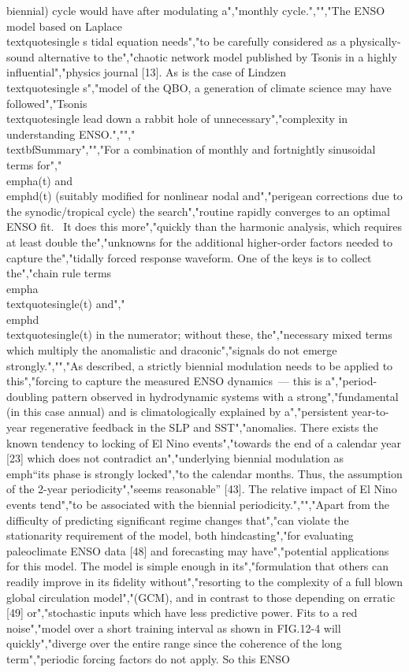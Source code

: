 {{{{{{{{{{biennial) cycle would have after modulating a","monthly cycle.","","The ENSO model based on Laplace\\textquotesingle s tidal equation needs","to be carefully considered as a physically-sound alternative to the","chaotic network model published by Tsonis in a highly influential","physics journal {[}13{]}. As is the case of Lindzen\\textquotesingle s","model of the QBO, a generation of climate science may have followed","Tsonis\\textquotesingle{} lead down a rabbit hole of unnecessary","complexity in understanding ENSO.","","\\textbf{Summary}","","For a combination of monthly and fortnightly sinusoidal terms for","\\emph{a(t)} and \\emph{d(t)} (suitably modified for nonlinear nodal and","perigean corrections due to the synodic/tropical cycle) the search","routine rapidly converges to an optimal ENSO fit.~ It does this more","quickly than the harmonic analysis, which requires at least double the","unknowns for the additional higher-order factors needed to capture the","tidally forced response waveform. One of the keys is to collect the","chain rule terms \\emph{a\\textquotesingle(t)} and","\\emph{d\\textquotesingle(t)} in the numerator; without these, the","necessary mixed terms which multiply the anomalistic and draconic","signals do not emerge strongly.","","As described, a strictly biennial modulation needs to be applied to this","forcing to capture the measured ENSO dynamics~--- this is a","period-doubling pattern observed in hydrodynamic systems with a strong","fundamental (in this case annual) and is climatologically explained by a","persistent year-to-year regenerative feedback in the SLP and SST","anomalies. There exists the known tendency to locking of El Nino events","towards the end of a calendar year {[}23{]} which does not contradict an","underlying biennial modulation as \\emph{``its phase is strongly locked","to the calendar months. Thus, the assumption of the 2-year periodicity","seems reasonable''} {[}43{]}. The relative impact of El Nino events tend","to be associated with the biennial periodicity.","","Apart from the difficulty of predicting significant regime changes that","can violate the stationarity requirement of the model, both hindcasting","for evaluating paleoclimate ENSO data {[}48{]} and forecasting may have","potential applications for this model. The model is simple enough in its","formulation that others can readily improve in its fidelity without","resorting to the complexity of a full blown global circulation model","(GCM), and in contrast to those depending on erratic {[}49{]} or","stochastic inputs which have less predictive power. Fits to a red noise","model over a short training interval as shown in FIG.12-4 will quickly","diverge over the entire range since the coherence of the long term","periodic forcing factors do not apply. So this ENSO }}}}}}}}}}
